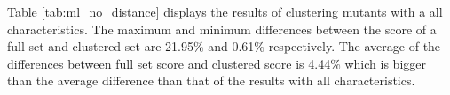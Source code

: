 \documentclass[../../main]{subfiles}
\begin{document}
\FloatBarrier
Table \ref{tab:ml_no_distance} displays the results of clustering mutants with a all characteristics.
The maximum and minimum differences between the score of a full set and clustered set are 21.95\% and 0.61\% respectively.
The average of the differences between full set score and clustered score is 4.44\% which is bigger than the average difference than that of the results with all characteristics.
\end{document}
